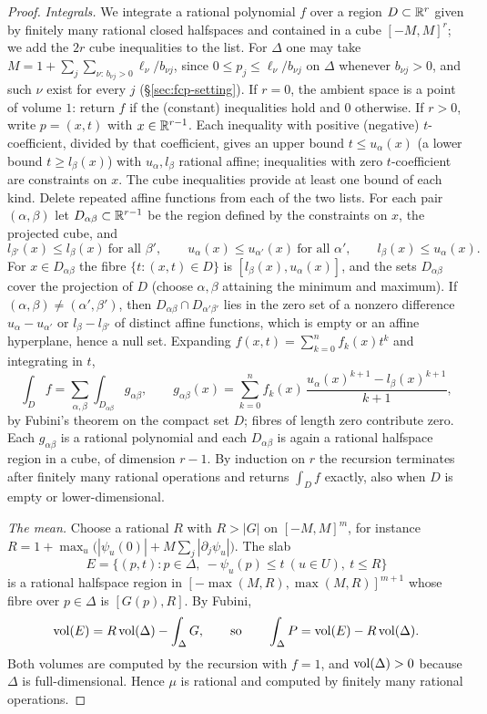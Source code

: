 \begin{proof}
\emph{Integrals.} We integrate a rational polynomial $f$ over a region $D\subset\mathbb{R}^r$ given by finitely many rational
closed halfspaces and contained in a cube $[-M,M]^r$; we add the $2r$ cube inequalities to the list. For $\Delta$ one may
take $M=1+\sum_{j}\sum_{\nu:\,b_{\nu j}>0}\ell_\nu/b_{\nu j}$, since $0\le p_j\le\ell_\nu/b_{\nu j}$ on $\Delta$ whenever
$b_{\nu j}>0$, and such $\nu$ exist for every $j$ (\S\ref{sec:fcp-setting}). If $r=0$, the ambient space is a point of
volume $1$: return $f$ if the (constant) inequalities hold and $0$ otherwise. If $r>0$, write $p=(x,t)$ with
$x\in\mathbb{R}^{r-1}$. Each inequality with positive (negative) $t$-coefficient, divided by that coefficient, gives an upper
bound $t\le u_\alpha(x)$ (a lower bound $t\ge l_\beta(x)$) with $u_\alpha,l_\beta$ rational affine; inequalities with zero
$t$-coefficient are constraints on $x$. The cube inequalities provide at least one bound of each kind. Delete repeated
affine functions from each of the two lists. For each pair $(\alpha,\beta)$ let $D_{\alpha\beta}\subset\mathbb{R}^{r-1}$ be the
region defined by the constraints on $x$, the projected cube, and
\[
 l_{\beta'}(x)\le l_\beta(x)\ \text{for all }\beta',\qquad u_\alpha(x)\le u_{\alpha'}(x)\ \text{for all }\alpha',\qquad
 l_\beta(x)\le u_\alpha(x).
\]
For $x\in D_{\alpha\beta}$ the fibre $\{t:(x,t)\in D\}$ is $[l_\beta(x),u_\alpha(x)]$, and the sets $D_{\alpha\beta}$
cover the projection of $D$ (choose $\alpha,\beta$ attaining the minimum and maximum). If $(\alpha,\beta)\ne(\alpha',\beta')$,
then $D_{\alpha\beta}\cap D_{\alpha'\beta'}$ lies in the zero set of a nonzero difference $u_\alpha-u_{\alpha'}$ or
$l_\beta-l_{\beta'}$ of distinct affine functions, which is empty or an affine hyperplane, hence a null set. Expanding
$f(x,t)=\sum_{k=0}^{n}f_k(x)t^k$ and integrating in $t$,
\[
 \int_Df=\sum_{\alpha,\beta}\int_{D_{\alpha\beta}}g_{\alpha\beta},\qquad
 g_{\alpha\beta}(x)=\sum_{k=0}^nf_k(x)\,\frac{u_\alpha(x)^{k+1}-l_\beta(x)^{k+1}}{k+1},
\]
by Fubini's theorem on the compact set $D$; fibres of length zero contribute zero. Each $g_{\alpha\beta}$ is a rational
polynomial and each $D_{\alpha\beta}$ is again a rational halfspace region in a cube, of dimension $r-1$. By induction on
$r$ the recursion terminates after finitely many rational operations and returns $\int_Df$ exactly, also when $D$ is
empty or lower-dimensional.

\emph{The mean.} Choose a rational $R$ with $R>|G|$ on $[-M,M]^m$, for instance
$R=1+\max_u\bigl(|\psi_u(0)|+M\sum_j|\partial_j\psi_u|\bigr)$. The slab
\[
 E=\{(p,t):p\in\Delta,\ -\psi_u(p)\le t\ (u\in U),\ t\le R\}
\]
is a rational halfspace region in $[-\max(M,R),\max(M,R)]^{m+1}$ whose fibre over $p\in\Delta$ is $[G(p),R]$. By
Fubini,
\[
 \operatorname{vol}(E)=R\operatorname{vol}(\Delta)-\int_\Delta G,\qquad\text{so}\qquad \int_\Delta P=\operatorname{vol}(E)-R\operatorname{vol}(\Delta).
\]
Both volumes are computed by the recursion with $f=1$, and $\operatorname{vol}(\Delta)>0$ because $\Delta$ is full-dimensional. Hence
$\mu$ is rational and computed by finitely many rational operations.


\end{proof}
